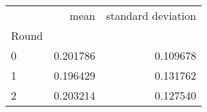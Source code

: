 \begin{tabular}{lrr}
\toprule
{} &      mean &  standard deviation \\
Round &           &                     \\
\midrule
0     &  0.201786 &            0.109678 \\
1     &  0.196429 &            0.131762 \\
2     &  0.203214 &            0.127540 \\
\bottomrule
\end{tabular}
